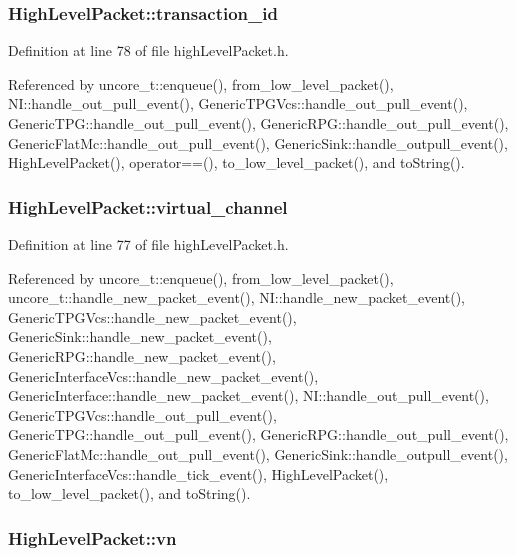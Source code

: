 \subsubsection[{transaction\_\-id}]{ {\bf HighLevelPacket::transaction\_\-id}}\label{classHighLevelPacket_287c21f9e31f882ffe8c8ff353dab087}




Definition at line 78 of file highLevelPacket.h.

Referenced by uncore\_\-t::enqueue(), from\_\-low\_\-level\_\-packet(), NI::handle\_\-out\_\-pull\_\-event(), GenericTPGVcs::handle\_\-out\_\-pull\_\-event(), GenericTPG::handle\_\-out\_\-pull\_\-event(), GenericRPG::handle\_\-out\_\-pull\_\-event(), GenericFlatMc::handle\_\-out\_\-pull\_\-event(), GenericSink::handle\_\-outpull\_\-event(), HighLevelPacket(), operator==(), to\_\-low\_\-level\_\-packet(), and toString().
\subsubsection[{virtual\_\-channel}]{ {\bf HighLevelPacket::virtual\_\-channel}}\label{classHighLevelPacket_0e369f54800e9bb403f8277b94cbaa96}




Definition at line 77 of file highLevelPacket.h.

Referenced by uncore\_\-t::enqueue(), from\_\-low\_\-level\_\-packet(), uncore\_\-t::handle\_\-new\_\-packet\_\-event(), NI::handle\_\-new\_\-packet\_\-event(), GenericTPGVcs::handle\_\-new\_\-packet\_\-event(), GenericSink::handle\_\-new\_\-packet\_\-event(), GenericRPG::handle\_\-new\_\-packet\_\-event(), GenericInterfaceVcs::handle\_\-new\_\-packet\_\-event(), GenericInterface::handle\_\-new\_\-packet\_\-event(), NI::handle\_\-out\_\-pull\_\-event(), GenericTPGVcs::handle\_\-out\_\-pull\_\-event(), GenericTPG::handle\_\-out\_\-pull\_\-event(), GenericRPG::handle\_\-out\_\-pull\_\-event(), GenericFlatMc::handle\_\-out\_\-pull\_\-event(), GenericSink::handle\_\-outpull\_\-event(), GenericInterfaceVcs::handle\_\-tick\_\-event(), HighLevelPacket(), to\_\-low\_\-level\_\-packet(), and toString().
\subsubsection[{vn}]{ {\bf HighLevelPacket::vn}}\label{classHighLevelPacket_0e554b43c609ab77758300f332679a29}




